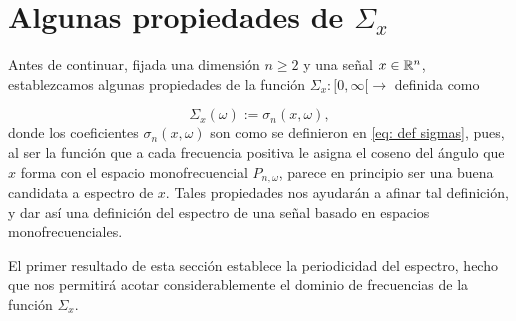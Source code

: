\section{Algunas propiedades de $\Sigma_{x}$}

Antes de continuar, 
fijada una dimensión $n \geq 2$ y una 
señal $x \in \mathbb{R}^{n}$,
establezcamos algunas propiedades de la función
$\Sigma_{x}: [0, \infty[ \longrightarrow$ definida como

\begin{equation}
\label{eq: estudiando espectro}
\Sigma_{x}(\omega) := \sigma_{n}(x, \omega),
\end{equation}
donde los coeficientes $\sigma_{n}(x, \omega)$
son como se definieron en 
\eqref{eq: def sigmas}, 
pues, al ser la función que a cada
frecuencia positiva le asigna el coseno del 
ángulo que $x$ forma con el espacio monofrecuencial
$P_{n, \omega}$, parece en principio ser una buena candidata
a espectro de $x$. Tales propiedades nos ayudarán a afinar tal
definición, y dar así una definición del espectro
de una señal basado en espacios monofrecuenciales.


El primer resultado de esta sección establece
la periodicidad del espectro, hecho que
nos permitirá
acotar considerablemente el dominio de frecuencias
de la función $\Sigma_{x}$.

